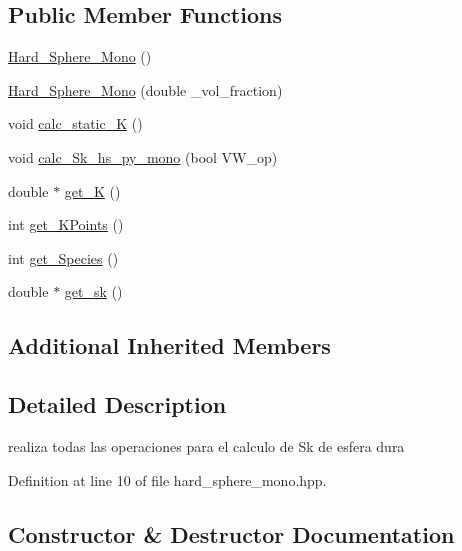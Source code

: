 \subsection*{Public Member Functions}
\begin{DoxyCompactItemize}
\item 
\hyperlink{class_hard___sphere___mono_a4977bad0c48d88aa5576fc3a7ea6d3e4}{Hard\+\_\+\+Sphere\+\_\+\+Mono} ()
\item 
\hyperlink{class_hard___sphere___mono_afc64b7bbedbe1bf58845873a56b7cf31}{Hard\+\_\+\+Sphere\+\_\+\+Mono} (double \+\_\+vol\+\_\+fraction)
\item 
void \hyperlink{class_hard___sphere___mono_a1c5ba5b514186eeb1f3dc511f118f6fc}{calc\+\_\+static\+\_\+K} ()
\item 
void \hyperlink{class_hard___sphere___mono_a8cad324bc3424d321f4f226dae7c5899}{calc\+\_\+\+Sk\+\_\+hs\+\_\+py\+\_\+mono} (bool V\+W\+\_\+op)
\item 
double $\ast$ \hyperlink{class_hard___sphere___mono_af4e9ac494fb3130c23b45d4f62f18e15}{get\+\_\+K} ()
\item 
int \hyperlink{class_hard___sphere___mono_ac61f362b8911751221b436b2fd5c82be}{get\+\_\+\+K\+Points} ()
\item 
int \hyperlink{class_hard___sphere___mono_a6a4e6591d542dd84b28c461b80fc8156}{get\+\_\+\+Species} ()
\item 
double $\ast$ \hyperlink{class_hard___sphere___mono_a46132342e416dc056f5637037b30f8e4}{get\+\_\+sk} ()
\end{DoxyCompactItemize}
\subsection*{Additional Inherited Members}


\subsection{Detailed Description}
realiza todas las operaciones para el calculo de Sk de esfera dura 



Definition at line 10 of file hard\+\_\+sphere\+\_\+mono.\+hpp.



\subsection{Constructor \& Destructor Documentation}
